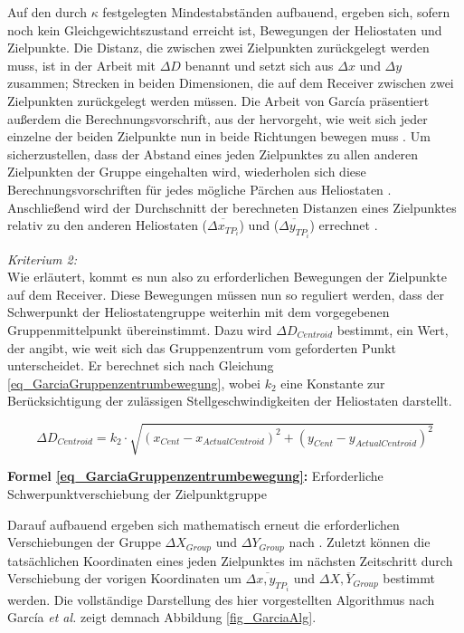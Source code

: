 Auf den durch $\kappa$ festgelegten Mindestabständen aufbauend, ergeben sich, sofern noch kein Gleichgewichtszustand erreicht ist, Bewegungen der Heliostaten und Zielpunkte.
Die Distanz, die zwischen zwei Zielpunkten zurückgelegt werden muss, ist in der Arbeit mit $\Delta D$ benannt und setzt sich aus $\Delta x$ und $\Delta y$ zusammen; Strecken in beiden Dimensionen, die auf dem Receiver zwischen zwei Zielpunkten zurückgelegt werden müssen.
Die Arbeit von García präsentiert außerdem die Berechnungsvorschrift, aus der hervorgeht, wie weit sich jeder einzelne der beiden Zielpunkte nun in beide Richtungen bewegen muss \cite[S.9-10]{Garcia2}.
Um sicherzustellen, dass der Abstand eines jeden Zielpunktes zu allen anderen Zielpunkten der Gruppe eingehalten wird, wiederholen sich diese Berechnungsvorschriften für jedes mögliche Pärchen aus Heliostaten \cite[S.9]{Garcia2}.
Anschließend wird der Durchschnitt der berechneten Distanzen eines Zielpunktes relativ zu den anderen Heliostaten ($\overline{\Delta x_{TP_i}}$) und ($\overline{\Delta y_{TP_i}}$) errechnet \cite[S.10]{Garcia2}.


\textit{Kriterium 2:}\\
Wie erläutert, kommt es nun also zu erforderlichen Bewegungen der Zielpunkte auf dem Receiver.
Diese Bewegungen müssen nun so reguliert werden, dass der Schwerpunkt der Heliostatengruppe weiterhin mit dem vorgegebenen Gruppenmittelpunkt übereinstimmt.
Dazu wird $\Delta D_{Centroid}$ bestimmt, ein Wert, der angibt, wie weit sich das Gruppenzentrum vom geforderten Punkt unterscheidet.
Er berechnet sich nach Gleichung \ref{eq_GarciaGruppenzentrumbewegung}, wobei $k_2$ eine Konstante zur Berücksichtigung der zulässigen Stellgeschwindigkeiten der Heliostaten darstellt. \cite[S.10]{Garcia2}

\begin{equation} \label{eq_GarciaGruppenzentrumbewegung}
    \Delta D_{Centroid} = k_2 \cdot \sqrt{\left(x_{Cent}-x_{Actual Centroid}\right)^2+\left(y_{Cent}-y_{Actual Centroid}\right)^2}
\end{equation}
\centerline{\small{\textsf{\textbf{Formel \ref{eq_GarciaGruppenzentrumbewegung}:}} Erforderliche Schwerpunktverschiebung der Zielpunktgruppe}}

Darauf aufbauend ergeben sich mathematisch erneut die erforderlichen Verschiebungen der Gruppe $\Delta X_{Group}$ und $\Delta Y_{Group}$ nach \cite[S.10]{Garcia2}.
Zuletzt können die tatsächlichen Koordinaten eines jeden Zielpunktes im nächsten Zeitschritt durch Verschiebung der vorigen Koordinaten um $\overline{\Delta x,y_{TP_i}}$ und $\overline{\Delta X,Y_{Group}}$ bestimmt werden.
Die vollständige Darstellung des hier vorgestellten Algorithmus nach García \textit{et al.} \cite{Garcia2} zeigt demnach Abbildung \ref{fig_GarciaAlg}.

